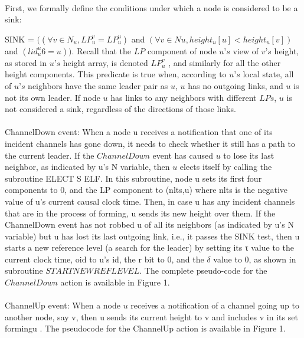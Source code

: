 \paragraph{}First, we formally define the conditions under which a node is considered to be a sink:
\begin{list}{--}{spacing}
	\item SINK = $((\forall v \in N_u, LP_u ^v = LP_u ^u )$ and $(\forall v ∈ Nu , height_u [u] < height_u [v])$ and $(lid_u ^u 6= u))$. Recall that the $LP$ component of node $u’s$ view of $v’s$ height, as stored in $u’s$ height array, is denoted $LP_u ^v$ , and similarly for all the other height components. This predicate is true when, according to $u’s$ local state, all of $u’s$ neighbors have the same leader pair as $u$, $u$ has no outgoing links, and $u$ is not its own leader. If node $u$ has links to any neighbors with different $LPs$, $u$ is not considered a sink, regardless of the directions of those links.
\end{list}
\paragraph{}ChannelDown event: When a node u receives a notification that one of its incident channels has gone down, it needs to check whether it still has a path to the current leader. If the $ChannelDown$ event has caused $u$ to lose its last neighbor, as indicated by u’s N variable, then $u$ elects itself by calling the subroutine ELECT S ELF. In this subroutine, node u sets its first four components to 0, and the LP component to (nlts,u) where nlts is the negative value of u’s current causal clock time. Then, in case u has any incident channels that are in the process of forming, u sends its new height over them. If the ChannelDown event has not robbed u of all its neighbors (as indicated by u’s N variable) but u has lost its last outgoing link, i.e., it passes the SINK test, then u starts a new reference level (a search for the leader) by setting its τ value to the current clock time, oid to u’s id, the r bit to 0, and the $\delta$ value to $0$, as shown in subroutine $STARTNEWREFLEVEL$. The complete pseudo-code for the $ChannelDown$ action is available in Figure 1.

\paragraph{}ChannelUp event: When a node $u$ receives a notification of a channel going up to another node, say v, then u sends its current height to v and includes v in its set formingu . The pseudocode for the ChannelUp action is available in Figure 1.

